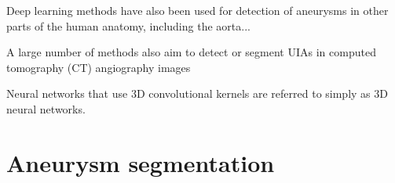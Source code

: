 Deep learning methods have also been used for detection of aneurysms in other parts of the human anatomy, including the aorta... 

A large number of methods also aim to detect or segment UIAs in computed tomography (CT) angiography images 


Neural networks that use 3D convolutional kernels are referred to simply as 3D neural networks. 



%
%

\section{Aneurysm segmentation}





